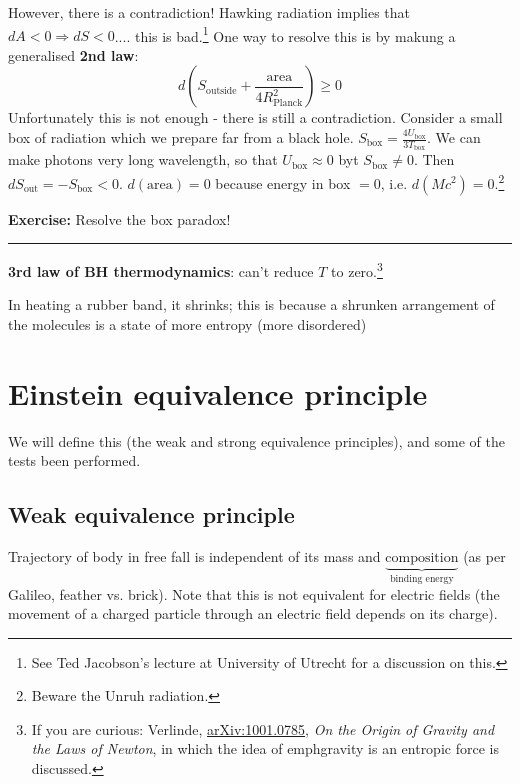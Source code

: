 \documentclass[a4paper]{article} %
\newcommand{\exercise}[2]
{
\begin{framed}
\textbf{Exercise:} #1 \\\hrule
#2
\end{framed}
}
\begin{document}
However, there is a contradiction! Hawking radiation implies that $dA<0 \Rightarrow dS<0$.... this is bad.\footnote{See Ted Jacobson's lecture at University of Utrecht for a discussion on this.} One way to resolve this is by makung a generalised \textbf{2nd law}:
\begin{equation}
d\left(S_{\text{outside}}+\frac{\text{area}}{4R_{\text{Planck}}^2}\right)\geq 0
\end{equation}
Unfortunately this is not enough - there is still a contradiction. Consider a small box of radiation which we prepare far from a black hole. $S_{\text{box}}=\frac{4U_{\text{box}}}{3T_\text{box}}$. We can make photons very long wavelength, so that $U_{\text{box}}\approx 0$ byt $S_{\text{box}}\neq 0$. Then $dS_{\text{out}}=-S_{\text{box}}<0$. $d(\text{area})=0$ because energy in box $=0$, i.e. $d(Mc^2)=0$.\footnote{Beware the Unruh radiation.}

\exercise{Resolve the box paradox!}{}

\textbf{3rd law of BH thermodynamics}: can't reduce $T$ to zero.\footnote{If you are curious: Verlinde, 
\href{arXiv.org/abs/1001.0785}{arXiv:1001.0785}, \emph{On the Origin of Gravity and the Laws of Newton}, in which the idea of emph{gravity is an entropic force} is discussed.}

In heating a rubber band, it shrinks; this is because a shrunken arrangement of the molecules is a state of more entropy (more disordered)

\begin{center}
{
}
\end{center}

																					
\section{Einstein equivalence principle}
We will define this (the weak and strong equivalence principles), and some of the tests been performed.

\subsection{Weak equivalence principle}
Trajectory of body in free fall is independent of its mass and $\underbrace{\text{composition}}_{\text{binding energy}}$ (as per Galileo, feather vs. brick). Note that this is not equivalent for electric fields (the movement of a charged particle through an electric field depends on its charge).
\end{document}
